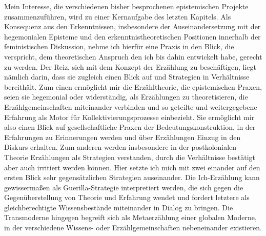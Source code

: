 Mein Interesse, die verschiedenen bisher besprochenen epistemischen Projekte
zusammenzuführen, wird zu einer Kernaufgabe des letzten Kapitels. Als Konsequenz
aus den Erkenntnissen, insbesondere der Auseinandersetzung mit der hegemonialen
Episteme und den erkenntnistheoretischen Positionen innerhalb der feministischen
Diskussion,  nehme ich hierfür eine Praxis in den Blick, die verspricht, dem
theoretischen Anspruch den ich bis dahin entwickelt habe, gerecht zu werden. Der
Reiz, sich mit dem Konzept der Erzählung zu beschäftigen, liegt nämlich darin,
dass sie zugleich einen Blick auf und Strategien in Verhältnisse bereithält. Zum
einen ermöglicht mir die Erzähltheorie, die epistemischen Praxen, seien sie
hegemonial oder widerständig, als Erzählungen zu theoretisieren, die
Erzählgemeinschaften miteinander verbinden und so geteilte und weitergegebene
Erfahrung als Motor für Kollektivierungsprozesse einbezieht. Sie ermöglicht mir
also einen Blick auf gesellschaftliche Praxen der Bedeutungskonstruktion, in der
Erfahrungen zu Erinnerungen werden und über Erzählungen Einzug in den Diskurs
erhalten. Zum anderen werden insbesondere in der postkolonialen Theorie
Erzählungen als Strategien verstanden, durch die Verhältnisse bestätigt aber
auch irritiert werden können. Hier setzte ich mich mit zwei einander auf den
ersten Blick sehr gegensätzlichen Strategien auseinander. Die Ich-Erzählung kann
gewissermaßen als Guerilla-Strategie interpretiert werden, die sich gegen die
Gegenüberstellung von Theorie und Erfahrung wendet und fordert letztere als
gleichberechtigte Wissensbestände miteinander in Dialog zu bringen. Die
Transmoderne hingegen begreift sich als Metaerzählung einer globalen Moderne, in
der verschiedene Wissens- oder Erzählgemeinschaften nebeneinander existieren.

